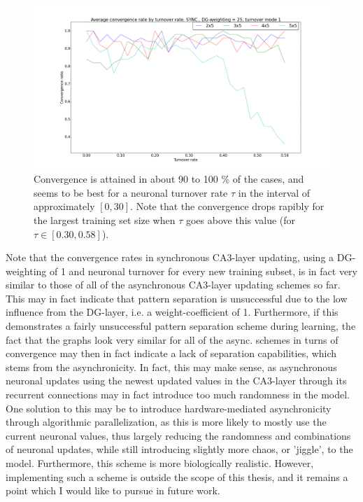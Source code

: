 \begin{figure}
    \centering
    \includegraphics[width=14cm]{fig/avg_convergence_by_turnover_rate_sync_dgw_25_t_m_1_no_err_bars}
    \caption{Convergence is attained in about 90 to 100 \% of the cases, and seems to be best for a neuronal turnover rate $\tau$ in the interval of approximately $[0, 30]$. Note that the convergence drops rapibly for the largest training set size when $\tau$ goes above this value (for $\tau \in [0.30, 0.58]$).}
    \label{fig:avg_convergence_by_turnover_rate_sync_dgw_25_t_m_1_no_err_bars}
\end{figure}

Note that the convergence rates in synchronous CA3-layer updating, using a DG-weighting of 1 and neuronal turnover for every new training subset, is in fact very similar to those of all of the asynchronous CA3-layer updating schemes so far. This may in fact indicate that pattern separation is unsuccessful due to the low influence from the DG-layer, i.e. a weight-coefficient of 1. Furthermore, if this demonstrates a fairly unsuccessful pattern separation scheme during learning, the fact that the graphs look very similar for all of the async. schemes in turns of convergence may then in fact indicate a lack of separation capabilities, which stems from the asynchronicity. In fact, this may make sense, as asynchronous neuronal updates using the newest updated values in the CA3-layer through its recurrent connections may in fact introduce too much randomness in the model. One solution to this may be to introduce hardware-mediated asynchronicity through algorithmic parallelization, as this is more likely to mostly use the current neuronal values, thus largely reducing the randomness and combinations of neuronal updates, while still introducing slightly more chaos, or 'jiggle', to the model. Furthermore, this scheme is more biologically realistic. However, implementing such a scheme is outside the scope of this thesis, and it remains a point which I would like to pursue in future work.

